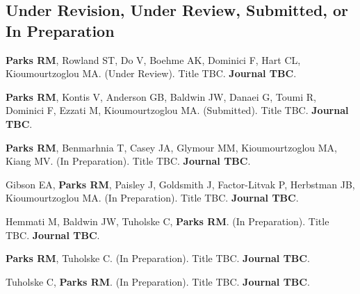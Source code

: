 \subsection*{Under Revision, Under Review, Submitted, or In Preparation}

\noindent \textbf{Parks RM}, Rowland ST, Do V, Boehme AK, Dominici F, Hart CL, Kioumourtzoglou MA. (Under Review). Title TBC. \textbf{Journal TBC}. \bigskip

\noindent \textbf{Parks RM}, Kontis V, Anderson GB, Baldwin JW, Danaei G, Toumi R, Dominici F, Ezzati M, Kioumourtzoglou MA. (Submitted). Title TBC. \textbf{Journal TBC}. \bigskip

\noindent \textbf{Parks RM}, Benmarhnia T, Casey JA, Glymour MM, Kioumourtzoglou MA, Kiang MV. (In Preparation). Title TBC. \textbf{Journal TBC}. \bigskip

\noindent Gibson EA, \textbf{Parks RM}, Paisley J, Goldsmith J, Factor-Litvak P, Herbstman JB, Kioumourtzoglou MA. (In Preparation). Title TBC. \textbf{Journal TBC}. \bigskip

\noindent Hemmati M, Baldwin JW, Tuholske C, \textbf{Parks RM}. (In Preparation). Title TBC. \textbf{Journal TBC}. \bigskip

\noindent \textbf{Parks RM}, Tuholske C. (In Preparation). Title TBC. \textbf{Journal TBC}. \bigskip

\noindent Tuholske C, \textbf{Parks RM}. (In Preparation). Title TBC. \textbf{Journal TBC}.


